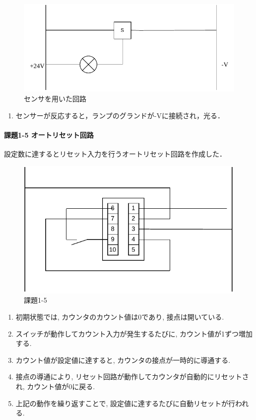 \begin{figure}[H]
  \centering
  \includegraphics[scale=0.7]{sozai/4.pdf}
  \caption{センサを用いた回路}
\end{figure}

\begin{enumerate}
  \item センサーが反応すると，ランプのグランドが-Vに接続され，光る．
\end{enumerate}

\paragraph{課題1-5 オートリセット回路}
設定数に達するとリセット入力を行うオートリセット回路を作成した．

\begin{figure}[H]
  \centering
  \includegraphics[scale=0.7]{sozai/18.pdf}
  \caption{課題1-5}
\end{figure}
\begin{enumerate}
  \item 初期状態では, カウンタのカウント値は0であり, 接点は開いている.
  \item スイッチが動作してカウント入力が発生するたびに, カウント値が1ずつ増加する.
  \item カウント値が設定値に達すると, カウンタの接点が一時的に導通する.
  \item 接点の導通により, リセット回路が動作してカウンタが自動的にリセットされ, カウント値が0に戻る.
  \item 上記の動作を繰り返すことで, 設定値に達するたびに自動リセットが行われる.
\end{enumerate}



